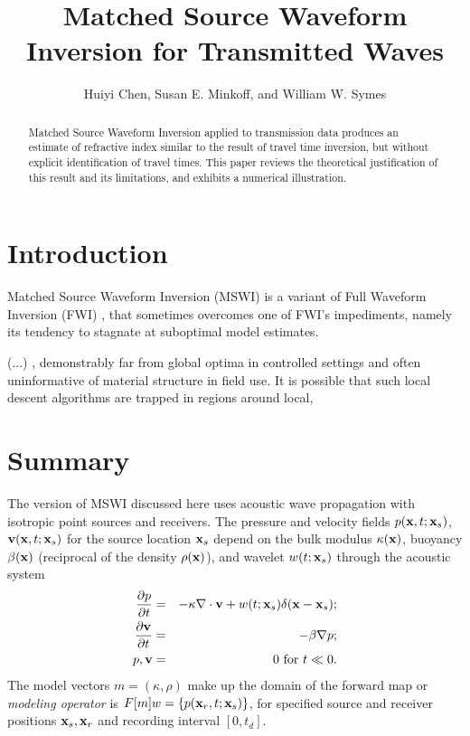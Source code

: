 \title{Matched Source Waveform Inversion for Transmitted Waves}
\author{Huiyi Chen, Susan E. Minkoff, and William W. Symes}



\maketitle
\parskip 12pt

\begin{abstract}
Matched Source Waveform Inversion applied to transmission data
produces an estimate of refractive index similar to the result of
travel time inversion, but without explicit identification of travel
times. This paper reviews the theoretical justification of this result
and its limitations, and exhibits a numerical illustration. 
\end{abstract}
\setlength{\parindent}{0cm}

\section{Introduction}
Matched Source Waveform Inversion (MSWI) is a variant of Full Waveform
Inversion (FWI) \cite[]{VirieuxOperto:09}, that sometimes overcomes
one of FWI's impediments, namely its tendency to stagnate at
suboptimal model estimates.

(...)
,
demonstrably far from global optima in controlled settings and often
uninformative of material structure in field use. It is possible that
such local descent algorithms are trapped in regions around local,
\section{Summary}
The version of MSWI discussed here uses acoustic wave propagation with
isotropic point sources and receivers.
The pressure and velocity fields $p({\bf x},t;{\bf x}_s)$, ${\bf v}({\bf x},t;{\bf x}_s)$ for the source location ${\bf x}_s$ depend on the bulk modulus $\kappa({\bf x})$, buoyancy $\beta({\bf x})$ (reciprocal of the density $\rho({\bf x})$), and wavelet $w(t;{\bf x}_s)$ through the acoustic system
\begin{eqnarray}
  \label{eqn:awe}
 \frac{\partial p}{\partial t} & = &- \kappa \nabla \cdot {\bf v} +
w(t;{\bf x}_s) \delta({\bf x}-{\bf x}_s); \nonumber \\
\frac{\partial {\bf v}}{\partial t} & = & - \beta \nabla p; \\ 
p, {\bf v} & = & 0 \mbox{ for }  t \ll 0.
\end{eqnarray}
The model vectors $m=(\kappa,\rho)$ make up the domain of the forward
map or {\em modeling operator} is $F[m]w = \{p({\bf x}_r,t;{\bf
  x}_s)\}$, for specified source and receiver positions ${\bf x}_s, {\bf x}_r$ and
recording interval $[0,t_d]$. 

